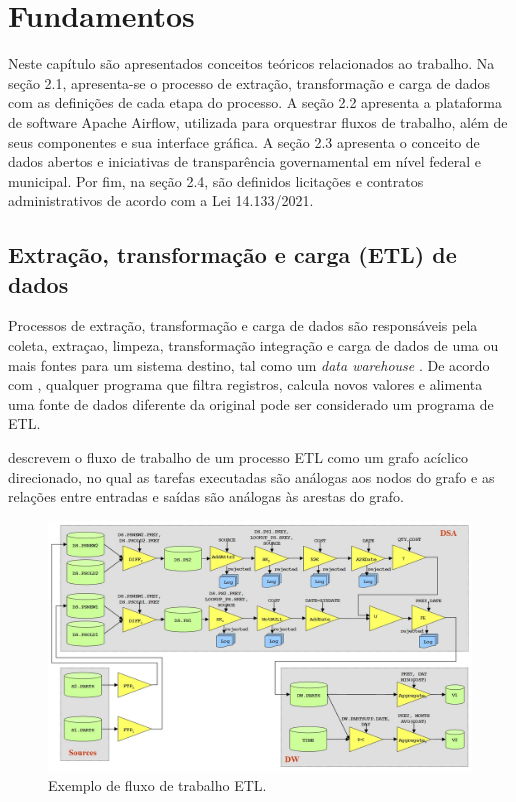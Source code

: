 \chapter{Fundamentos}\label{cap:fundamentos}
Neste capítulo são apresentados conceitos teóricos relacionados ao trabalho. Na seção 2.1, apresenta-se o processo de extração, transformação e carga de dados com as definições de cada etapa do processo. A seção 2.2 apresenta a plataforma de software Apache Airflow, utilizada para orquestrar fluxos de trabalho, além de seus componentes e sua interface gráfica. A seção 2.3 apresenta o conceito de dados abertos e iniciativas de transparência governamental em nível federal e municipal.
Por fim, na seção 2.4, são definidos licitações e contratos administrativos de acordo com a Lei 14.133/2021.

\section{Extração, transformação e carga (ETL) de dados}

Processos de extração, transformação e carga de dados são responsáveis pela coleta, extraçao, limpeza, transformação integração e carga de dados de uma ou mais
fontes para um sistema destino, tal como um \textit{data warehouse} . De acordo com \cite{vassiliadis2009extraction}, qualquer programa que filtra registros, calcula novos valores e alimenta uma fonte de dados diferente da original pode ser considerado um programa de ETL.

\cite{vassiliadis2009extraction} descrevem o fluxo de trabalho de um processo ETL como um grafo acíclico direcionado, no qual as tarefas executadas são análogas aos nodos do grafo e as relações entre entradas e saídas são análogas às arestas do grafo.

\begin{figure}[htb]
	\caption{\label{fig:Fig_1}Exemplo de fluxo de trabalho ETL.}
	\begin{center}
		\includegraphics[scale=0.32]{images/etl.png}
	\end{center}
\end{figure}

